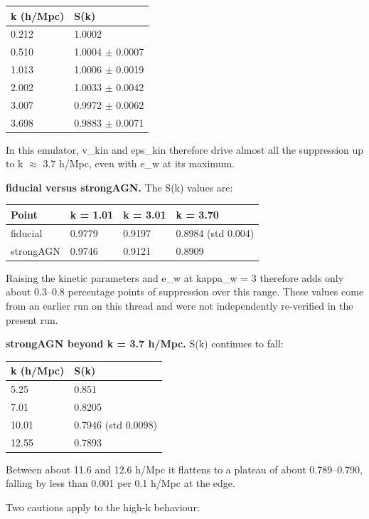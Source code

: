 \documentclass[11pt,a4paper]{article}
\begin{document}
\begin{longtable}{@{}p{}p{}@{}}
\toprule
\textbf{k (h/Mpc)} & \textbf{S(k)} \\ \midrule \endhead
0.212 & 1.0002 \\
0.510 & 1.0004 $\pm$ 0.0007 \\
1.013 & 1.0006 $\pm$ 0.0019 \\
2.002 & 1.0033 $\pm$ 0.0042 \\
3.007 & 0.9972 $\pm$ 0.0062 \\
3.698 & 0.9883 $\pm$ 0.0071 \\
\bottomrule\end{longtable}
In this emulator, v\_kin and eps\_kin therefore drive almost all the suppression up to k $\approx$ 3.7 h/Mpc, even with e\_w at its maximum.

\textbf{fiducial versus strongAGN.} The S(k) values are:

\begin{longtable}{@{}p{}p{}p{}p{}@{}}
\toprule
\textbf{Point} & \textbf{k = 1.01} & \textbf{k = 3.01} & \textbf{k = 3.70} \\ \midrule \endhead
fiducial & 0.9779 & 0.9197 & 0.8984 (std 0.004) \\
strongAGN & 0.9746 & 0.9121 & 0.8909 \\
\bottomrule\end{longtable}
Raising the kinetic parameters and e\_w at kappa\_w = 3 therefore adds only about 0.3--0.8 percentage points of suppression over this range. These values come from an earlier run on this thread and were not independently re-verified in the present run.

\textbf{strongAGN beyond k = 3.7 h/Mpc.} S(k) continues to fall:

\begin{longtable}{@{}p{}p{}@{}}
\toprule
\textbf{k (h/Mpc)} & \textbf{S(k)} \\ \midrule \endhead
5.25 & 0.851 \\
7.01 & 0.8205 \\
10.01 & 0.7946 (std 0.0098) \\
12.55 & 0.7893 \\
\bottomrule\end{longtable}
Between about 11.6 and 12.6 h/Mpc it flattens to a plateau of about 0.789--0.790, falling by less than 0.001 per 0.1 h/Mpc at the edge.

Two cautions apply to the high-k behaviour:
\end{document}
